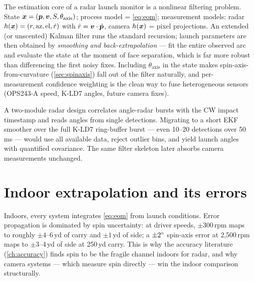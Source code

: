 The estimation core of a radar launch monitor is a nonlinear filtering
problem. State $\bm{x} = (\bm{p}, \bm{v}, S, \theta_{\mathrm{axis}})$;
process model = \cref{eq:eom}; measurement models:
radar $h(\bm{x}) = (r, \mathrm{az}, \mathrm{el}, \dot r)$ with
$\dot r = \bm{v}\cdot\hat{\bm{p}}$, camera $h(\bm{x})$ = pixel
projections. An extended (or unscented) Kalman filter runs the standard
recursion; launch parameters are then obtained by \emph{smoothing and
back-extrapolation} --- fit the entire observed arc and evaluate the state
at the moment of face separation, which is far more robust than
differencing the first noisy fixes. Including
$\theta_{\mathrm{axis}}$ in the state makes spin-axis-from-curvature
(\cref{sec:spinaxis}) fall out of the filter naturally, and per-measurement
confidence weighting is the clean way to fuse heterogeneous sensors
(OPS243-A speed, K-LD7 angles, future camera fixes).

\begin{implication}
A two-module radar design correlates angle-radar bursts with the CW
impact timestamp and reads angles from single detections. Migrating to a
short EKF smoother over the full K-LD7 ring-buffer burst --- even 10--20
detections over 50\,ms --- would use all available data, reject outlier
bins, and yield launch angles with quantified covariance. The same filter
skeleton later absorbs camera measurements unchanged.
\end{implication}

\section{Indoor extrapolation and its errors}

Indoors, every system integrates \cref{eq:eom} from launch conditions.
Error propagation is dominated by spin uncertainty: at driver speeds,
$\pm300$\,rpm maps to roughly $\pm4$--6\,yd of carry and $\pm1$\,yd of
side; a $\pm2\si{\degree}$ spin-axis error at 2,500\,rpm maps to $\pm3$--4\,yd
of side at 250\,yd carry. This is why the accuracy literature
(\cref{ch:accuracy}) finds spin to be the fragile channel indoors for
radar, and why camera systems --- which measure spin directly --- win the
indoor comparison structurally.
